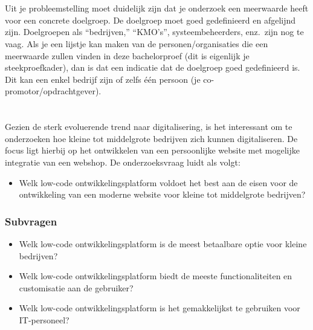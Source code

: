 \section{}%
\label{sec:probleemstelling}


Uit je probleemstelling moet duidelijk zijn dat je onderzoek een meerwaarde heeft voor een concrete doelgroep. De doelgroep moet goed gedefinieerd en afgelijnd zijn. Doelgroepen als ``bedrijven,'' ``KMO's'', systeembeheerders, enz.~zijn nog te vaag. Als je een lijstje kan maken van de personen/organisaties die een meerwaarde zullen vinden in deze bachelorproef (dit is eigenlijk je steekproefkader), dan is dat een indicatie dat de doelgroep goed gedefinieerd is. Dit kan een enkel bedrijf zijn of zelfs één persoon (je co-promotor/opdrachtgever).

\section{}%
\label{sec:onderzoeksvraag}

Gezien de sterk evoluerende trend naar digitalisering, is het interessant om te onderzoeken hoe kleine tot middelgrote bedrijven zich kunnen digitaliseren. De focus ligt hierbij op het ontwikkelen van een persoonlijke website met mogelijke integratie van een webshop. De onderzoeksvraag luidt als volgt: 
 
\vspace{\baselineskip}

\begin{itemize}
  \item Welk low-code ontwikkelingsplatform voldoet het best aan de eisen voor de ontwikkeling van een moderne website voor kleine tot middelgrote bedrijven?
\end{itemize}

\subsubsection{Subvragen}
\label{sec:Subvragen}
\begin{itemize}
  \item Welk low-code ontwikkelingsplatform is de meest betaalbare optie voor kleine bedrijven?
  \item Welk low-code ontwikkelingsplatform biedt de meeste functionaliteiten en customisatie aan de gebruiker?
  \item Welk low-code ontwikkelingsplatform is het gemakkelijkst te gebruiken voor \\IT-personeel?
\end{itemize}

